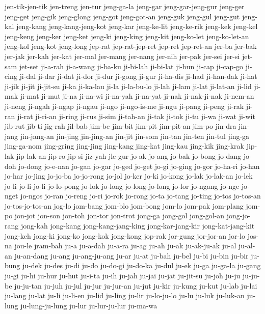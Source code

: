 {jen-tik-jen-tik jen-treng jen-tur jeng-ga-la jeng-gar jeng-gar-jeng-gur
jeng-ger jeng-get jeng-gik jeng-glong jeng-got jeng-got-an jeng-guk
jeng-gul jeng-gut jeng-kal jeng-kang jeng-kang-jeng-kot jeng-kar
jeng-ke-lit jeng-ke-rik jeng-kek jeng-kel jeng-keng jeng-ker jeng-ket
jeng-ki jeng-king jeng-kit jeng-ko-let jeng-ko-let-an jeng-kol jeng-kot
jeng-long jep-rat jep-rat-jep-ret jep-ret jep-ret-an jer-ba jer-bak
jer-jak jer-kah jer-kat jer-mal jer-mang jer-nang jer-nih jer-pak jer-sei
jer-si jet-sam jet-set ji-a-rah ji-a-wang ji-ba-ku ji-bi-lah ji-bi-lat
ji-bun ji-cap ji-cap-go ji-cing ji-dal ji-dar ji-dat ji-dor ji-dur ji-gong
ji-gur ji-ha-dis ji-had ji-han-dak ji-hat ji-jik ji-jit ji-jit-su ji-ka
ji-ka-lau ji-la ji-la-bu-lo ji-lah ji-lam ji-lat ji-lat-an ji-lid ji-mak
ji-mat ji-mut ji-na ji-na-wi ji-na-yah ji-na-yat ji-nak ji-nak-ji-nak
ji-nem-an ji-neng ji-ngah ji-ngap ji-ngau ji-ngo ji-ngo-is-me ji-ngu
ji-pang ji-peng ji-rak ji-ran ji-rat ji-ri-an ji-ring ji-rus ji-sim
ji-tah-an ji-tak ji-tok ji-tu ji-wa ji-wat ji-wit jib-rut jib-ti jig-rah
jil-bab jim-be jim-bit jim-pit jim-pit-an jim-po jin-dra jin-jang
jin-jang-an jin-jing jin-jing-an jin-jit jin-som jin-tan jin-ten jin-tul
jing-ga jing-ga-nom jing-gring jing-jing jing-kang jing-kat jing-kau
jing-kik jing-krak jip-lak jip-lak-an jip-ro jip-si jiz-yah jle-gur jo-ak
jo-ang jo-bak jo-bong jo-dang jo-doh jo-dong jo-e-nan jo-gan jo-gar jo-ged
jo-get jo-gi jo-ging jo-gor jo-ha-ri jo-han jo-har jo-jing jo-jo-ba
jo-jo-rong jo-jol jo-ker jo-ki jo-kong jo-lak jo-lak-an jo-lek jo-li
jo-li-jo-li jo-lo-pong jo-lok jo-long jo-long-jo-long jo-lor jo-ngang
jo-nge jo-nget jo-ngos jo-ran jo-reng jo-ri jo-rok jo-rong jo-ta jo-tang
jo-ting jo-tos jo-tos-an jo-tos-jo-tos-an jog-lo jom-bang jom-blo jom-bong
jom-lo jom-pak jom-plang jom-po jon-jot jon-son jon-toh jon-tor jon-trot
jong-ga jong-gol jong-gol-an jong-jo-rang jong-kah jong-kang
jong-kang-jang-king jong-kar-jang-kir jong-kat-jang-kit jong-keh jong-ki
jong-ko jong-kok jong-kong jop-rak jor-gung jor-jor-an jor-lo jos-na
jou-le jram-bah ju-a ju-a-dah ju-a-ra ju-ag ju-ah ju-ak ju-ak-ju-ak ju-al
ju-al-an ju-an-dang ju-ang ju-ang-ju-ang ju-ar ju-at ju-bah ju-bel ju-bi
ju-bin ju-bir ju-bung ju-dek ju-des ju-di ju-do ju-do-gi ju-do-ka ju-dul
ju-ek ju-ga ju-ga-la ju-gang ju-gi ju-hi ju-hur ju-hut ju-i-ta ju-ih
ju-jah ju-jai ju-jat ju-jit-su ju-joh ju-ju ju-ju-be ju-ju-tan ju-juh
ju-jul ju-jur ju-jur-an ju-jut ju-kir ju-kung ju-kut ju-lab ju-lai ju-lang
ju-lat ju-li ju-li-en ju-lid ju-ling ju-lir ju-lo-ju-lo ju-lu ju-luk
ju-luk-an ju-lung ju-lung-ju-lung ju-lur ju-lur-ju-lur ju-ma-wa
}
